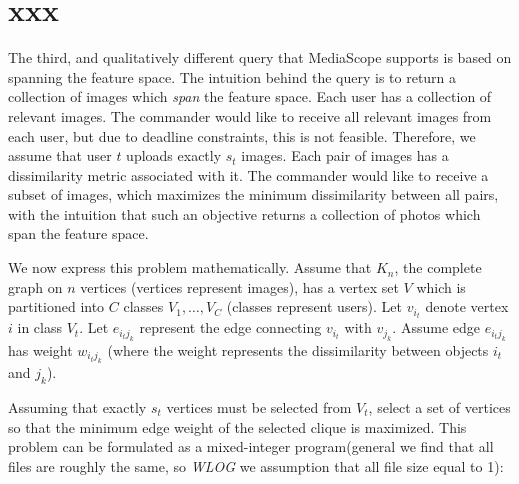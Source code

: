 
\section{xxx}
%
The third, and qualitatively different query that MediaScope supports
is based on spanning the feature space.
%
The intuition behind the query is to return a collection of images
which \emph{span} the feature space.
%
Each user has a collection of relevant images.  The commander would like to receive all relevant images from each user, but due to deadline constraints, this is not feasible.  Therefore, we assume that user $t$ uploads exactly $s_t$ images.  Each pair of images has a dissimilarity metric associated with it.  The commander would like to receive a subset of images, which maximizes the minimum dissimilarity between all pairs, with the intuition that such an objective returns a collection of photos which span the feature space.

We now express this problem mathematically.  Assume that $K_n$, the complete graph on $n$ vertices (vertices
represent images), has a vertex set $V$ which is partitioned into $C$
classes $V_{1},\ldots,V_{C}$ (classes represent users).
%
Let $v_{i_t}$ denote vertex $i$ in class $V_t$.
%
Let $e_{i_t j_k}$ represent the edge connecting $v_{i_t}$ with
$v_{j_k}$.
%
Assume edge $e_{i_tj_k}$ has weight $w_{i_tj_k}$ (where the weight
represents the dissimilarity between objects $i_t$ and $j_k$). 

Assuming that exactly $s_t$ vertices must be selected from $V_t$, select a set of vertices so that the minimum edge weight of the selected clique is maximized.  This problem can be formulated as a mixed-integer program(general we find that all files are roughly the same, so \emph{WLOG} we assumption that all file size equal to 1):

